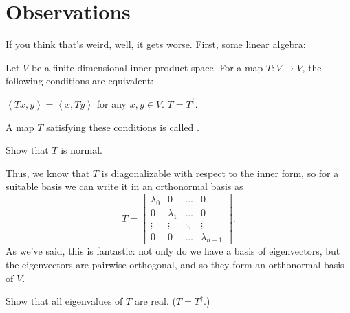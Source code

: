 \section{Observations}
If you think that's weird, well, it gets worse.
First, some linear algebra:
\begin{definition}
	Let $V$ be a finite-dimensional inner product space.
	For a map $T \colon V \to V$, the following conditions are equivalent:
	\begin{itemize}
		\ii $\left< Tx, y\right> = \left< x, Ty \right>$
		for any $x,y \in V$.
		\ii $T = T^\dagger$.
	\end{itemize}
	A map $T$ satisfying these conditions is called .
\end{definition}
\begin{ques}
	Show that $T$ is normal.
\end{ques}
Thus, we know that $T$ is diagonalizable
with respect to the inner form, so for a suitable basis we
can write it in an orthonormal basis as
\[
	T = \begin{bmatrix}
		\lambda_0 & 0 & \dots & 0 \\
		0 & \lambda_1 & \dots & 0 \\
		\vdots & \vdots & \ddots & \vdots \\
		0 & 0 & \dots & \lambda_{n-1}
	\end{bmatrix}.
\]
As we've said, this is fantastic:
not only do we have a basis of eigenvectors,
but the eigenvectors are pairwise orthogonal,
and so they form an orthonormal basis of $V$.
\begin{ques}
	Show that all eigenvalues of $T$ are real.
	($T = T^\dagger$.)
\end{ques}

